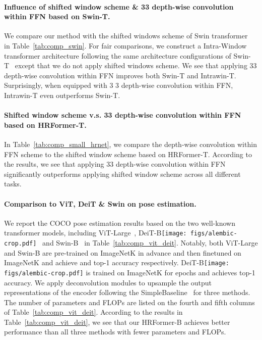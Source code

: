 \documentclass{article}
\def \deitbasedisup {DeiT-B\alambic} \def \alambic {\texttt{[image: figs/alembic-crop.pdf]}\xspace}
\begin{document}
\paragraph{Influence of shifted window scheme \& 33 depth-wise convolution within FFN based on Swin-T.}
We compare our method with the shifted windows scheme of Swin transformer~\cite{liu2021swin} in Table~\ref{tab:comp_swin}.
For fair comparisons, we construct a Intra-Window transformer architecture following the same architecture configurations of Swin-T~\cite{liu2021swin} except that we do not apply shifted windows scheme.
We see that applying 33 depth-wise convolution within FFN improves both Swin-T
and Intrawin-T.
Surprisingly, when equipped with 3 3 depth-wise convolution within FFN, Intrawin-T even outperforms Swin-T.


\paragraph{Shifted window scheme v.s. 33 depth-wise convolution within FFN based on HRFormer-T.}
In Table~\ref{tab:comp_small_hrnet},
we compare the  depth-wise convolution within FFN scheme
to the shifted window scheme based on HRFormer-T.
According to the results, we see that applying 33 depth-wise convolution within FFN
significantly outperforms applying shifted window scheme across all different tasks.


\paragraph{Comparison to ViT, DeiT  \& Swin on pose estimation.}
We report the COCO pose estimation results based on the two well-known transformer models, including ViT-Large~\cite{dosovitskiy2020image}, {\deitbasedisup}~\cite{touvron2020deit}
and Swin-B~\cite{liu2021swin} in Table~\ref{tab:comp_vit_deit}.
Notably, both ViT-Large and Swin-B are pre-trained on ImageNetK in advance and then finetuned on ImageNetK and achieve  and  top-1 accuracy respectively.
  {\deitbasedisup} is trained on ImageNetK for  epochs and achieves  top-1 accuracy.
We apply deconvolution modules
to upsample the output representations of the encoder
following the SimpleBaseline~\cite{xiao2018simple} for three methods.
The number of parameters and FLOPs are listed on the fourth and fifth columns of Table~\ref{tab:comp_vit_deit}.
According to the results in Table~\ref{tab:comp_vit_deit},
we see that our HRFormer-B achieves better performance than all three methods with fewer parameters and FLOPs.
\end{document}
